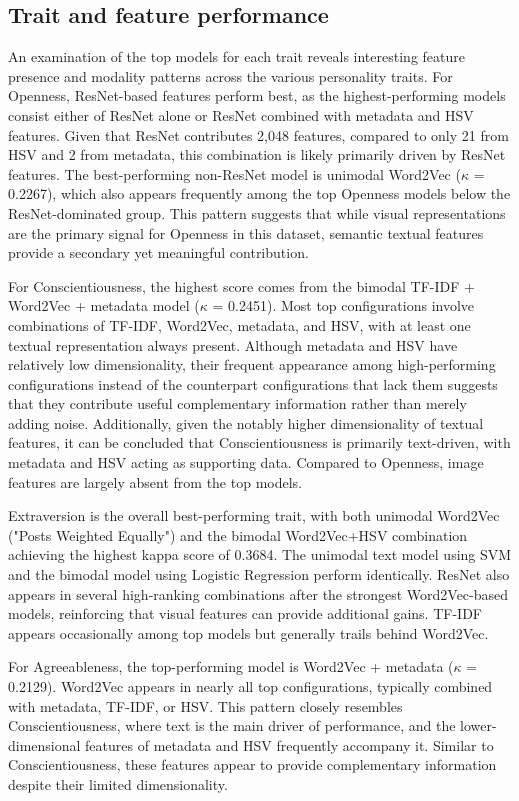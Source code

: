 \subsection{Trait and feature performance}
An examination of the top models for each trait reveals interesting feature presence and modality patterns across the various personality traits. For Openness, ResNet-based features perform best, as the highest-performing models consist either of ResNet alone or ResNet combined with metadata and HSV features. Given that ResNet contributes 2,048 features, compared to only 21 from HSV and 2 from metadata, this combination is likely primarily driven by ResNet features. The best-performing non-ResNet model is unimodal Word2Vec ($\kappa$ = 0.2267), which also appears frequently among the top Openness models below the ResNet-dominated group. This pattern suggests that while visual representations are the primary signal for Openness in this dataset, semantic textual features provide a secondary yet meaningful contribution.

For Conscientiousness, the highest score comes from the bimodal TF-IDF + Word2Vec + metadata model ($\kappa$ = 0.2451). Most top configurations involve combinations of TF-IDF, Word2Vec, metadata, and HSV, with at least one textual representation always present.  Although metadata and HSV have relatively low dimensionality, their frequent appearance among high-performing configurations instead of the counterpart configurations that lack them suggests that they contribute useful complementary information rather than merely adding noise. Additionally, given the notably higher dimensionality of textual features, it can be concluded that Conscientiousness is primarily text-driven, with metadata and HSV acting as supporting data. Compared to Openness, image features are largely absent from the top models.

Extraversion is the overall best-performing trait, with both unimodal Word2Vec ("Posts Weighted Equally") and the bimodal Word2Vec+HSV combination achieving the highest kappa score of 0.3684. The unimodal text model using SVM and the bimodal model using Logistic Regression perform identically. ResNet also appears in several high-ranking combinations after the strongest Word2Vec-based models, reinforcing that visual features can provide additional gains. TF-IDF appears occasionally among top models but generally trails behind Word2Vec.


For Agreeableness, the top-performing model is Word2Vec + metadata ($\kappa$ = 0.2129). Word2Vec appears in nearly all top configurations, typically combined with metadata, TF-IDF, or HSV. This pattern closely resembles Conscientiousness, where text is the main driver of performance, and the lower-dimensional features of metadata and HSV frequently accompany it. Similar to Conscientiousness, these features appear to provide complementary information despite their limited dimensionality.

